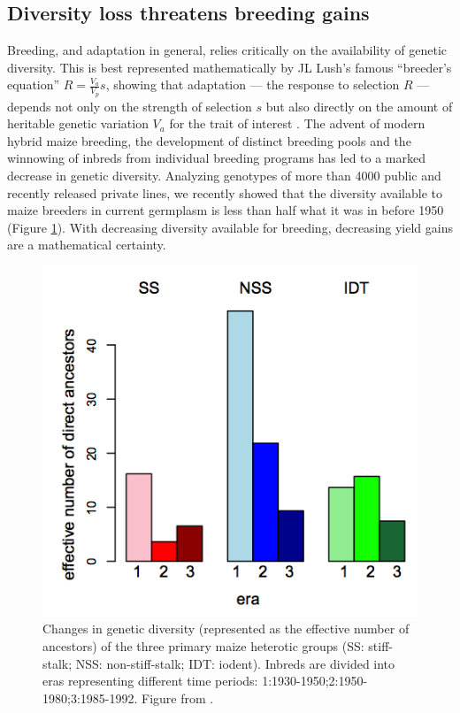 \documentclass[12pt]{article}
\begin{document}
\subsection{Diversity loss threatens breeding gains}

Breeding, and adaptation in general, relies critically on the availability of genetic diversity. 
This is best represented mathematically by JL Lush's famous ``breeder's equation'' $R=\frac{V_a}{V_p}s$, showing that adaptation --- the response to selection $R$ --- depends not only on the strength of selection $s$ but also directly on the amount of heritable genetic variation $V_a$ for the trait of interest \citep{kelly2011breeder}. 
The advent of modern hybrid maize breeding, the development of distinct breeding pools and the winnowing of inbreds from individual breeding programs has led to a marked decrease in genetic diversity. 
Analyzing genotypes of more than 4000 public and recently released private lines, we recently showed that the diversity available to maize breeders in current germplasm is less than half what it was in before 1950 (Figure \ref{diversity}). 
With decreasing diversity available for breeding, decreasing yield gains are a mathematical certainty. 

\begin{figure}[h]
\includegraphics[width=0.5\linewidth]{joost_diversity.png}
\caption{Changes in genetic diversity (represented as the effective number of ancestors) of the three primary maize heterotic groups (SS: stiff-stalk; NSS: non-stiff-stalk; IDT: iodent). Inbreds are divided into eras representing different time periods: 1:1930-1950;2:1950-1980;3:1985-1992. Figure from \citet{van2012historical}.} 
\label{diversity}
\end{figure}
\end{document}
